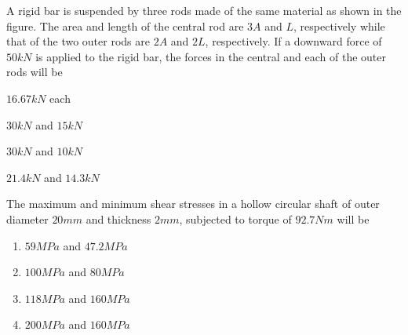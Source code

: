 \item A rigid bar is suspended by three rods made of the same material as shown in the figure. The area and length of the central rod are $3A$ and $L$, respectively while that of the two outer rods are $2A$ and $2L$, respectively. If a downward force of $50kN$ is applied to the rigid bar, the forces in the central and each of the outer rods will be
\\\begin{center}
\end{center}

\hfill{}
\begin{enumerate}
\begin{multicols}{4}
\item $16.67kN$ each
\item $30kN$ and $15kN$
\item $30kN$ and $10kN$
\item $21.4kN$ and $14.3kN$
\end{multicols}
\end{enumerate}

\item The maximum and minimum shear stresses in a hollow circular shaft of outer diameter $20mm$ and thickness $2mm$, subjected to torque of $92.7Nm$ will be

\hfill{}
\begin{enumerate}
\item $59MPa$ and $47.2MPa$
\item $100MPa$ and $80MPa$
\item $118MPa$ and $160MPa$
\item $200MPa$ and $160MPa$
\end{enumerate}

